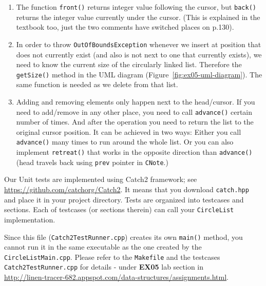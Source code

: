 \documentclass[11pt]{article}
\begin{document}
\begin{enumerate}
\item The function {\tt front()} returns integer value following the
cursor, but {\tt back()} returns the integer value currently under
the cursor. (This is explained in the textbook too, just the two comments 
have switched places on p.130). 
\item In order to throw {\tt OutOfBoundsException} whenever we 
insert at position that does not currently exist (and also is not next
to one that currently exists), we need to know the current size 
of the circularly linked list. Therefore the {\tt getSize()} method
in the UML diagram (Figure~\ref{fig:ex05-uml-diagram}). 
The same function is needed as we delete from that list.
\item Adding and removing elements only happen next to the head/cursor. 
If you need to add/remove in any other place, you need to call 
{\tt advance()} certain number of times. 
And after the operation you need to return the list to the original 
cursor position. It can be achieved in two ways: Either you call {\tt 
advance()} many times to run around the whole list. 
Or you can also implement {\tt retreat()} that works in the opposite
direction than {\tt advance()} (head travels back using {\tt prev} pointer
in {\tt CNote}.)
\end{enumerate}

Our Unit tests are implemented using Catch2 framework; 
see \url{https://github.com/catchorg/Catch2}. 
It means that you download {\tt catch.hpp} and place
it in your project directory. Tests are
organized into testcases and sections. 
Each of testcases (or sections therein) can 
call your {\tt CircleList} implementation.

Since this file ({\tt Catch2TestRunner.cpp}) creates its
own {\tt main()} method, you cannot run it in the same executable
as the one created by the {\tt CircleListMain.cpp}. 
Please refer to the {\tt Makefile} and the testcases
{\tt Catch2TestRunner.cpp} for details - under {\bf EX05} 
lab section in\\
\url{http://linen-tracer-682.appspot.com/data-structures/assignments.html}.
\end{document}
